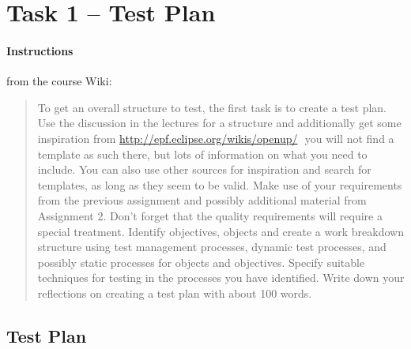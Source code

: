 %
%
%
%


\section{Task 1 -- Test Plan}

\paragraph{Instructions}\label{task-1-instructions}
from the course Wiki\cite{1dv600:lab3:instructions}:

\begin{quote}
  To get an overall structure to test, the first task is to create a test plan.
  Use the discussion in the lectures for a structure and additionally get some
  inspiration from \url{http://epf.eclipse.org/wikis/openup/} ­­ you will not
  find a template as such there, but lots of information on what you need to
  include.  You can also use other sources for inspiration and search for
  templates, as long as they seem to be valid. Make use of your requirements
  from the previous assignment and possibly additional material from Assignment
  2. Don't forget that the quality requirements will require a special
  treatment.  Identify objectives, objects and create a work breakdown
  structure using test management processes, dynamic test processes, and
  possibly static processes for objects and objectives. Specify suitable
  techniques for testing in the processes you have identified. Write down your
  reflections on creating a test plan with about 100 words.
\end{quote}



\subsection{Test Plan}\label{task-1a}

